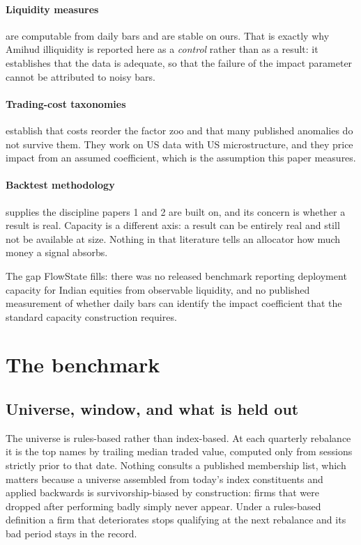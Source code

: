 \documentclass[11pt,a4paper]{article}
\begin{document}
\paragraph{Liquidity measures} \citep{amihud2002} are computable from daily bars and are stable on
ours. That is exactly why Amihud illiquidity is reported here as a \emph{control} rather than as a
result: it establishes that the data is adequate, so that the failure of the impact parameter
cannot be attributed to noisy bars.

\paragraph{Trading-cost taxonomies} \citep{novy2016} establish that costs reorder the factor zoo
and that many published anomalies do not survive them. They work on US data with US
microstructure, and they price impact from an assumed coefficient, which is the assumption this
paper measures.

\paragraph{Backtest methodology} \citep{lopez2018} supplies the discipline papers 1 and 2 are built
on, and its concern is whether a result is real. Capacity is a different axis: a result can be
entirely real and still not be available at size. Nothing in that literature tells an allocator how
much money a signal absorbs.

\begin{finding}
The gap FlowState fills: there was no released benchmark reporting deployment capacity for Indian
equities from observable liquidity, and no published measurement of whether daily bars can
identify the impact coefficient that the standard capacity construction requires.
\end{finding}

\section{The benchmark}

\subsection{Universe, window, and what is held out}

The universe is rules-based rather than index-based. At each quarterly rebalance it is the top names
by trailing median traded value, computed only from sessions strictly prior to that date. Nothing
consults a published membership list, which matters because a universe assembled from today's index
constituents and applied backwards is survivorship-biased by construction: firms that were dropped
after performing badly simply never appear. Under a rules-based definition a firm that deteriorates
stops qualifying at the next rebalance and its bad period stays in the record.
\end{document}
